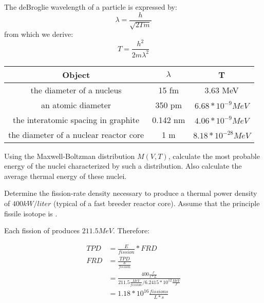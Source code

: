 \documentclass{hw}
\begin{document}
\solution
	The deBroglie wavelength of a particle is expressed by:
	\[ \lambda = \frac{h}{\sqrt{2Tm}} \]
	from which we derive:
	\[ T = \frac{h^2}{2m{\lambda}^2} \]
	
	\begin{table}[h]
		\begin{tabular}{ |c|c|c| }
			\hline
			Object & $ \lambda $ & T \\
			\hline
			the diameter of a nucleus & 15 fm & 3.63 MeV \\
			an atomic diameter & 350 pm & $ 6.68 * 10^{-9} MeV $ \\
			the interatomic spacing in graphite & 0.142 nm & $ 4.06*10^{-9} MeV $ \\
			the diameter of a nuclear reactor core & 1 m & $ 8.18*10^{-28} MeV $ \\
			\hline
		\end{tabular}
	\end{table}

	Using the Maxwell-Boltzman distribution $ M(V,T) $, calculate the most probable energy of the nuclei characterized by such a distribution. Also calculate the average thermal energy of these nuclei.

\solution


	Determine the fission-rate density necessary to produce a thermal power density of $ 400 kW/liter $ (typical of a fast breeder reactor core). Assume that the principle fissile isotope is .

\solution
	Each fission of  produces $ 211.5 MeV $. Therefore:
	
	\begin{align*}
		TPD &= \frac{E}{fission} * FRD \\
		FRD &= \frac{TPD}{\frac{E}{fission}} \\
		&= \frac{400 \frac{J}{s*L}}{211.5 \frac{MeV}{fission} / 6.2415*10^{12} \frac{MeV}{J}} \\
		&= 1.18*10^{16} \frac{fissions}{L*s}
	\end{align*}
\end{document}
